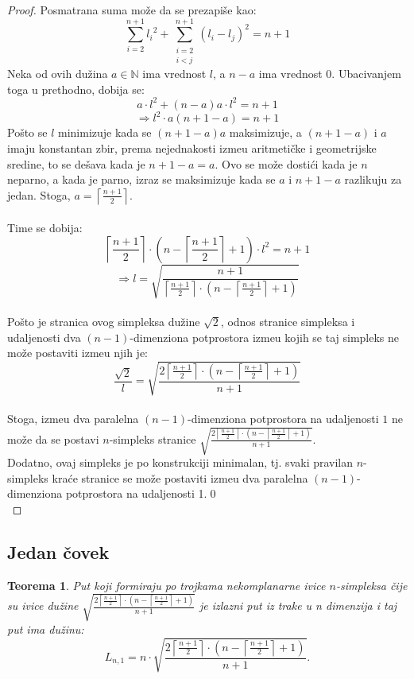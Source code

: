 \documentclass[11pt]{article}
\newtheorem{teo}{\bf Teorema}[section]
\begin{document}
\begin{proof}
\indent Posmatrana suma mo\v ze da se prezapi\v se kao:
$$\sum^{n+1}_{i=2}{l_i}^2 + \sum^{n+1}_{\substack{i=2\\ i<j}} {(l_i-l_j)}^2 = n+1$$
\indent Neka od ovih du\v zina $a\in \mathbb{N}$ ima vrednost $l$, a $n-a$ ima vrednost 0. Ubacivanjem toga u prethodno, dobija se:
$$a\cdot l^2+(n-a)a\cdot l^2=n+1$$
$$\Rightarrow l^2\cdot a(n+1-a)=n+1$$
\indent Po\v sto se $l$ minimizuje kada se $(n+1-a)a$ maksimizuje, a $(n+1-a)$ i $a$ imaju konstantan zbir, prema nejednakosti izme\dj u aritmeti\v cke i geometrijske sredine, to se de\v sava kada je $n+1-a=a$. Ovo se mo\v ze dosti\' ci kada je $n$ neparno, a kada je parno, izraz se maksimizuje kada se $a$ i $n+1-a$ razlikuju za jedan. Stoga, $a= \left \lceil{\frac{n+1}{2}}\right \rceil$.
\\
\\
\indent Time se dobija:
$$\left \lceil \frac{n+1}{2} \right \rceil \cdot \left( n-\left \lceil \frac{n+1}{2}\right \rceil +1\right)\cdot l^2=n+1$$
$$\Rightarrow l=\sqrt{\frac{n+1}{\left\lceil \frac{n+1}{2}\right\rceil \cdot \left( n-\left\lceil \frac{n+1}{2}\right\rceil+1\right)}}$$
\\
\indent Po\v sto je stranica ovog simpleksa du\v zine $\sqrt2$, odnos stranice simpleksa i udaljenosti dva $(n-1)$-dimenziona potprostora izme\dj u  kojih se taj simpleks ne mo\v ze postaviti izme\dj u njih je:
$$\frac{\sqrt2}{l}=\sqrt{\frac{2\left\lceil \frac{n+1}{2}\right\rceil\cdot \left( n-\left\lceil\frac{n+1}{2}\right\rceil+1\right)}{n+1}}$$
\\
\indent Stoga, izme\dj u dva paralelna $(n-1)$-dimenziona potprostora na udaljenosti $1$ ne mo\v ze da se postavi $n$-simpleks stranice  $\sqrt{\frac{2\left\lceil \frac{n+1}{2}\right\rceil\cdot \left( n-\left\lceil\frac{n+1}{2}\right\rceil+1\right)}{n+1}}$.
\\
\indent Dodatno, ovaj simpleks je po konstrukciji minimalan, tj. svaki pravilan $n$-simpleks kra\' ce stranice se mo\v ze postaviti izme\dj u dva paralelna $(n-1)$-dimenziona potprostora na udaljenosti 1.\qed
\\
\end{proof}
\subsection[Jedan \v covek]{Jedan \v covek}
\bigskip
\begin{teo}
	Put koji formiraju po trojkama nekomplanarne ivice $n$-simpleksa \v cije su ivice du\v zine
	$\sqrt{\frac{2\left\lceil \frac{n+1}{2}\right\rceil\cdot \left( n-\left\lceil\frac{n+1}{2}\right\rceil+1\right)}{n+1}}$
	je izlazni put iz trake u n dimenzija i taj put ima du\v zinu:
	$$L_{n,1}=n\cdot \sqrt{\frac{2\left\lceil \frac{n+1}{2}\right\rceil\cdot \left( n-\left\lceil\frac{n+1}{2}\right\rceil+1\right)}{n+1}}.$$
\end{teo}
\smallskip
\end{document}

